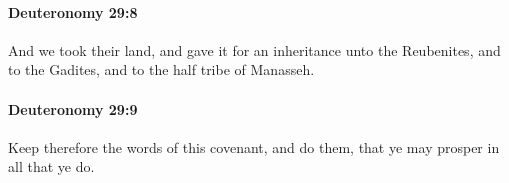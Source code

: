 		\paragraph{Deuteronomy 29:8} %
			\label{DEUTERONOMY-29-8}

			And we took their land, and gave it for an inheritance unto the Reubenites, and to the Gadites, and to the half tribe of Manasseh.


		\paragraph{Deuteronomy 29:9} %
			\label{DEUTERONOMY-29-9}

			Keep therefore the words of this covenant, and do them, that ye may prosper in all that ye do.


